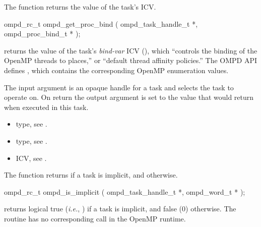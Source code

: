 %
\label{ompd:ompd_get_proc_bind}
\summary
The  function returns the value of the task's  ICV.

\format
\begin{cspecific}
\begin{ompSyntax}
ompd_rc_t ompd_get_proc_bind (
  ompd_task_handle_t *,
  ompd_proc_bind_t *
);
\end{ompSyntax}
\end{cspecific}

\descr
{} returns the value of the task's
\emph{bind-var} ICV (), which ``controls the
binding of the OpenMP threads to places,'' or ``default thread
affinity policies.''
%
The OMPD API defines
, which
contains the corresponding OpenMP enumeration values.
%

\argdesc
The input argument  is an opaque handle for a task and selects the task to operate on.
On return the output argument  is set to the value that  would return when
executed in this task.
%

\crossreferences
\begin{itemize}
	\item {} type, see .
	\item {} type, see .
	\item {} ICV, see .
\end{itemize}

\label{ompd:ompd_is_implicit}
\summary
The  function returns  if a task is implicit, and  otherwise.

\format
\begin{cspecific}
\begin{ompSyntax}
ompd_rc_t ompd_is_implicit (
  ompd_task_handle_t *,
  ompd_word_t *
);
\end{ompSyntax}
\end{cspecific}

\descr
{} returns logical true (\textit{i.e.}, )
if a task is implicit, and false (0) otherwise.
The routine has no corresponding call in the OpenMP runtime.

